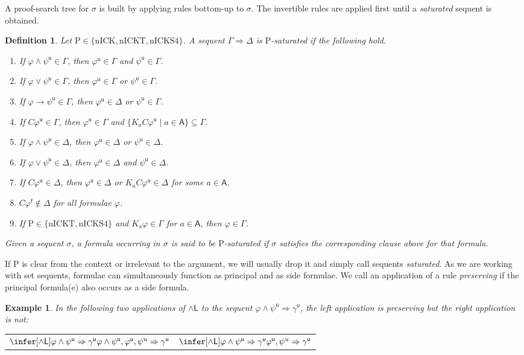 \documentclass{myifcolog}
\newcommand\C {C}
\newcommand{\K}{K}
\newcommand\A{\mathsf{A}}
\newcommand{\agi}{a}
\newcommand{\f}{\mathsf{f}}
\renewcommand{\u}{\mathsf{u}}
\newcommand{\hickp}{\mathrm{P}}
\newcommand{\nick}{\mathrm{nICK}}
\newcommand{\nickt}{\mathrm{nICKT}}
\newcommand{\nicks}{\mathrm{nICKS4}}
\newtheorem{definition}[theorem]{Definition}
\newtheorem{example}[theorem]{Example}
\numberwithin{theorem}{section}
\begin{document}
A proof-search tree for $\sigma$ is built by applying rules bottom-up to $\sigma$. The invertible rules are applied first until a \emph{saturated} sequent is obtained. 
\begin{definition}
    Let $\hickp \in \{\nick, \nickt, \nicks\}$. A sequent $\Gamma \Rightarrow \Delta$ is \emph{$\hickp$-saturated} if the following hold.
    \begin{enumerate}
        \item If $\varphi\wedge \psi^\u  \in \Gamma$, then $\varphi^\u  \in \Gamma$ and $\psi^\u  \in \Gamma$.
        \item If $\varphi \vee \psi^\u  \in \Gamma$, then $\varphi^\u  \in \Gamma$ or $\psi^\u  \in \Gamma$.
        \item If $\varphi \rightarrow \psi^\u  \in \Gamma$, then $\varphi^\u  \in \Delta$ or $\psi^\u  \in \Gamma$.
        \item If $\C \varphi^\u  \in \Gamma$, then $\varphi^\u  \in \Gamma$ and $\{\K_\agi \C \varphi^\u \mid \agi \in \A\} \subseteq \Gamma$.
        \item If $\varphi \wedge \psi^\u \in \Delta$, then $\varphi^\u \in \Delta$ or $\psi^\u \in \Delta$.
        \item If $\varphi \vee \psi^\u \in \Delta$, then $\varphi^\u \in \Delta$ and  $\psi^\u \in \Delta$.
        \item If $\C \varphi^\u \in \Delta$, then $\varphi^\u \in \Delta$ or $\K_\agi \C \varphi^\u \in \Delta$ for some $\agi \in \A$.
        \item $\C \varphi^\f \not \in \Delta$ for all formulae $\varphi$.
        \item If $\hickp \in \{\nickt, \nicks\}$ and $\K_\agi \varphi \in \Gamma$ for $\agi \in \A$, then $\varphi \in \Gamma$.
    \end{enumerate}
    Given a sequent $\sigma$, a formula occurring in $\sigma$ is said to be \emph{$\hickp$-saturated} if $\sigma$ satisfies the corresponding clause above for that formula. 
\end{definition}
If $\hickp$ is clear from the context or irrelevant to the argument, we will usually drop it and simply call sequents \emph{saturated}. As we are working with set sequents, formulae can simultaneously function as principal and as side formulae. We call an application of a rule \emph{preserving} if the principal formula(e) also occurs as a side formula. 

\begin{example}
    In the following two applications of $\wedge \mathsf{L}$ to the sequent $\varphi \wedge \psi^\u \Rightarrow \gamma^\u$, the left application is preserving but the right application is not:
\begin{center}
    \begin{tabular}{l l}
       $\infer[\wedge \mathsf{L}]{\varphi \wedge \psi^\u \Rightarrow \gamma^\u}{\varphi \wedge \psi^\u, \varphi^\u, \psi^u \Rightarrow \gamma^\u}$  &  $\infer[\wedge \mathsf{L}]{\varphi \wedge \psi^\u \Rightarrow \gamma^\u}{\varphi^\u, \psi^u \Rightarrow \gamma^\u}$\\
    \end{tabular}
\end{center}
\end{example}
\end{document}
